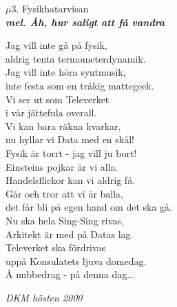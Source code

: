 \documentclass[a6paper,10pt]{article}
\newcommand{\mel}[1]{\small\textbf{\textit{mel. #1 \\}}}
\begin{document}
\setlength{\oddsidemargin}{-0.37in}
\noindent
\begin{center}
\Large $\mu$3. Fysikhatarvisan\\
\mel{Åh, hur saligt att få vandra}
\end{center}
Jag vill inte gå på fysik,\\
aldrig tenta termometerdynamik.\\
Jag vill inte höra syntmusik,\\
inte festa som en tråkig mattegeek.\\
Vi ser ut som Televerket\\
i vår jättefula overall.\\
Vi kan bara räkna kvarkar,\\
nu hyllar vi Data med en skål!
\vspace{5pt}\\
Fysik är torrt - jag vill ju bort!
\vspace{5pt}\\
Einsteins pojkar är vi alla.\\
Handelsflickor kan vi aldrig få.\\
Går och tror att vi är balla,\\
det får bli på egen hand om det ska gå.\\
Nu ska hela Sing-Sing rivas,\\
Arkitekt är med på Datas lag.\\
Televerket ska fördrivas\\
uppå Konsulatets ljuva domedag.
\vspace{5pt}\\
Å nubbedrag - på denna dag... 
\begin{flushright}
\textit{DKM hösten 2000}
\end{flushright}
\end{document}
